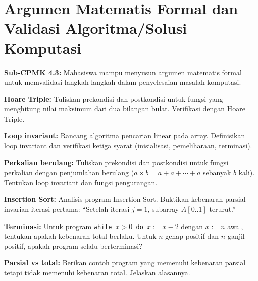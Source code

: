 \documentclass[../main]{subfiles}
\begin{document}
\chapter{Argumen Matematis Formal dan Validasi Algoritma/Solusi Komputasi}

\begin{subcpmk}
  \item \textbf{Sub-CPMK 4.3:} Mahasiswa mampu menyusun argumen matematis formal untuk memvalidasi langkah-langkah dalam penyelesaian masalah komputasi.
\end{subcpmk}










\begin{aktivitas}
  \item \textbf{Hoare Triple:} Tuliskan prekondisi dan postkondisi untuk fungsi yang menghitung nilai maksimum dari dua bilangan bulat. Verifikasi dengan Hoare Triple.
  \item \textbf{Loop invariant:} Rancang algoritma pencarian linear pada array. Definisikan loop invariant dan verifikasi ketiga syarat (inisialisasi, pemeliharaan, terminasi).
  \item \textbf{Perkalian berulang:} Tuliskan prekondisi dan postkondisi untuk fungsi perkalian dengan penjumlahan berulang ($a \times b = a + a + \cdots + a$ sebanyak $b$ kali). Tentukan loop invariant dan fungsi pengurangan.
  \item \textbf{Insertion Sort:} Analisis program Insertion Sort. Buktikan kebenaran parsial invarian iterasi pertama: ``Setelah iterasi $j = 1$, subarray $A[0..1]$ terurut.''
  \item \textbf{Terminasi:} Untuk program \texttt{while $x > 0$ do $x := x - 2$} dengan $x := n$ awal, tentukan apakah kebenaran total berlaku. Untuk $n$ genap positif dan $n$ ganjil positif, apakah program selalu berterminasi?
  \item \textbf{Parsial vs total:} Berikan contoh program yang memenuhi kebenaran parsial tetapi tidak memenuhi kebenaran total. Jelaskan alasannya.
\end{aktivitas}
\end{document}
